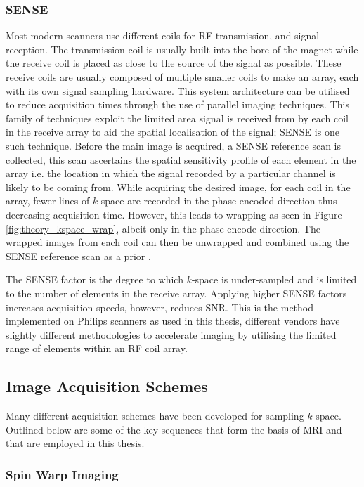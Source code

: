 \subsubsection{\ac*{SENSE}}
Most modern scanners use different coils for \ac{RF} transmission, and signal reception. The transmission coil is usually built into the bore of the magnet while the receive coil is placed as close to the source of the signal as possible. These receive coils are usually composed of multiple smaller coils to make an array, each with its own signal sampling hardware. This system architecture can be utilised to reduce acquisition times through the use of parallel imaging techniques. This family of techniques exploit the limited area signal is received from by each coil in the receive array to aid the spatial localisation of the signal; \ac{SENSE} is one such technique. Before the main image is acquired, a \ac{SENSE} reference scan is collected, this scan ascertains the spatial sensitivity profile of each element in the array i.e. the location in which the signal recorded by a particular channel is likely to be coming from. While acquiring the desired image, for each coil in the array, fewer lines of $k$-space are recorded in the phase encoded direction thus decreasing acquisition time. However, this leads to wrapping as seen in Figure \ref{fig:theory_kspace_wrap}, albeit only in the phase encode direction. The wrapped images from each coil can then be unwrapped and combined using the \ac{SENSE} reference scan as a prior \cite{pruessmann_sense_1999}. 

The \ac{SENSE} factor is the degree to which $k$-space is under-sampled and is limited to the number of elements in the receive array. Applying higher \ac{SENSE} factors increases acquisition speeds, however, reduces \ac{SNR}. This is the method implemented on Philips scanners as used in this thesis, different vendors have slightly different methodologies to accelerate imaging by utilising the limited range of elements within an \ac{RF} coil array.

\subsection{Image Acquisition Schemes}

Many different acquisition schemes have been developed for sampling $k$-space. Outlined below are some of the key sequences that form the basis of \ac{MRI} and that are employed in this thesis.

\subsubsection{Spin Warp Imaging}


